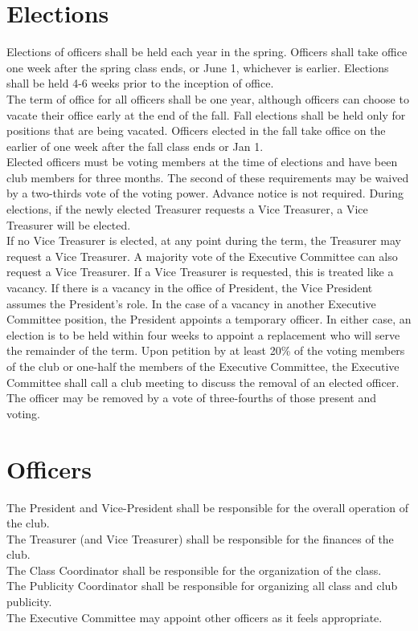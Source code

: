 \documentclass{article}
\begin{document}
\section{Elections}
Elections of officers shall be held each year in the spring. Officers shall  take office one week after the spring class ends, or June 1, whichever is earlier. Elections shall be held 4-6 weeks prior to the inception of office.\\
The term of office for all officers shall be one year, although officers can choose to vacate their office early at the end of the fall. Fall elections shall be held only for positions that are being vacated.  Officers elected in the fall take office on the earlier of one week after the fall class ends or Jan 1. \\
Elected officers must be voting members at the time of elections and have been club members for three months. The second of these requirements may be waived by a two-thirds vote of the voting power. Advance notice is not required. 
During elections, if the newly elected Treasurer requests a Vice Treasurer, a Vice Treasurer will be elected. \\
If no Vice Treasurer is elected, at any point during the term, the Treasurer may request a Vice Treasurer. A majority vote of the Executive Committee can also request a Vice Treasurer. If a Vice Treasurer is requested, this is treated like a vacancy. 
If there is a vacancy in the office of President, the Vice President assumes the President's role. In the case of a vacancy in another Executive Committee position, the President appoints a temporary officer. In either case, an election is to be held within four weeks to appoint a replacement who will serve the remainder of the term. 
Upon petition by at least 20\% of the voting members of the club or one-half the members of the Executive Committee, the Executive Committee shall call a club meeting to discuss the removal of an elected officer.  The officer may be
removed by a vote of three-fourths of those present and voting.\\
\section {Officers}
The President and Vice-President shall be responsible for the overall operation of the club.\\
The Treasurer (and Vice Treasurer) shall be responsible for the finances of the club.\\
The Class Coordinator shall be responsible for the organization of the class.\\
The Publicity Coordinator shall be responsible for organizing all class and club publicity. \\
The Executive Committee may appoint other officers as it feels appropriate. 
\end{document}
